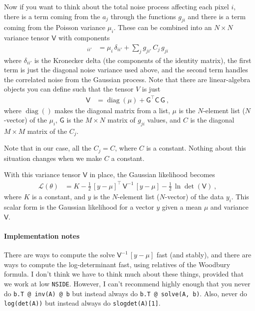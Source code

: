 \documentclass{article}
\DeclareMathOperator{\diag}{diag}
\begin{document}
Now if you want to think about the total noise process affecting each pixel $i$, there is a term coming from the $a_j$ through the functions $g_{ji}$ and there is a term coming from the Poisson variance $\mu_i$.
These can be combined into an $N\times N$ variance tensor $\mathsf{V}$ with components
\begin{align}
    [\mathsf{V}]_{ii'} &= \mu_i\,\delta_{ii'} + \sum_j g_{ji'}\,C_j\,g_{ji}
\end{align}
where $\delta_{ii'}$ is the Kronecker delta (the components of the identity matrix),
the first term is just the diagonal noise variance used above,
and the second term handles the correlated noise from the Gaussian process.
Note that there are linear-algebra objects you can define such that the tensor $V$ is just
\begin{align}
    \mathsf{V} &= \diag(\mu) + \mathsf{G}^\top\mathsf{C}\,\mathsf{G} ~,
\end{align}
where $\diag()$ makes the diagonal matrix from a list,
$\mu$ is the $N$-element list ($N$-vector) of the $\mu_i$,
$\mathsf{G}$ is the $M\times N$ matrix of $g_{ji}$ values,
and $C$ is the diagonal $M\times M$ matrix of the $C_j$.

Note that in our case, all the $C_j=C$, where $C$ is a constant.
Nothing about this situation changes when we make $C$ a constant.

With this variance tensor $\mathsf{V}$ in place, the Gaussian likelihood becomes
\begin{align}
    \mathscr{L}(\theta) &= K - \frac{1}{2}\,[y - \mu]^\top\,\mathsf{V}^{-1}\,[y - \mu] - \frac{1}{2}\,\ln\det(\mathsf{V}) ~,
\end{align}
where $K$ is a constant,
and $y$ is the $N$-element list ($N$-vector) of the data $y_i$.
This scalar form is the Gaussian likelihood for a vector $y$ given a mean $\mu$ and variance $\mathsf{V}$.

\paragraph{Implementation notes}
There are ways to compute the solve $\mathsf{V}^{-1}\,[y - \mu]$ fast (and stably),
and there are ways to compute the log-determinant fast, using relatives of the Woodbury formula.
I don't think we have to think much about these things, provided that we work at low \texttt{NSIDE}.
However, I can't recommend highly enough that you never do \texttt{b.T~@~inv(A)~@~b} but instead always do \texttt{b.T~@~solve(A,~b)}.
Also, never do \texttt{log(det(A))} but instead always do \texttt{slogdet(A)[1]}.
\end{document}
